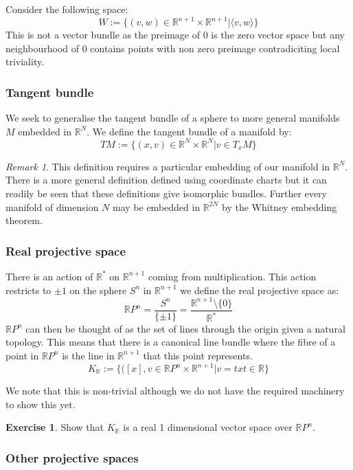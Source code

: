\documentclass[a4paper,10pt]{article}
\theoremstyle{plain}%
\theoremstyle{definition}
\newtheorem{exer}{Exercise}
\theoremstyle{remark}
\newtheorem{rem}{Remark}
\newcommand{\RR}{\mathbb{R}}
\begin{document}
Consider the following space:
$$W:=\{ (v,w) \in \RR^{n+1}\times \RR^{n+1} | \langle v,w \rangle \}$$
This is not a vector bundle as the preimage of $0$ is the zero vector space but any neighbourhood of $0$ 
contains points with non zero preimage contradiciting local triviality.

\subsubsection{Tangent bundle}

We seek to generalise the tangent bundle of a sphere to more general manifolds $M$ embedded in $\RR^N$.
We define the tangent bundle of a manifold by:
$$TM:=\{ (x,v)\in \RR^N\times\RR^N | v\in T_xM \}$$

\begin{rem}
 This definition requires a particular embedding of our manifold in $\RR^N$. There is a more general definition
defined using coordinate charts but it can readily be seen that these definitions give isomorphic bundles. Further 
every manifold of dimension $N$ may be embedded in $\RR^{2N}$ by the Whitney embedding theorem. 
\end{rem}


\subsubsection{Real projective space}

There is an action of $\RR^\ast$ on $\RR^{n+1}$ coming from multiplication. This action restricts to $\pm 1$ on 
the sphere $S^n$ in $\RR^{n+1}$ we define the real projective space as:
$$\RR P^n = \frac{S^n}{\{\pm 1\}} = \frac{\RR^{n+1}\setminus\{0\}}{\RR^\ast}$$
$\RR P^n$ can then be thought of as the set of lines through the origin given a natural topology. This means 
that there is a canonical line bundle where the fibre of a point in $\RR P^n$ is the line in $\RR^{n+1}$ that this 
point represents.
$$K_\RR := \{ ([x],v\in \RR P^n\times \RR^{n+1} | v=tx t\in \RR\}$$

We note that this is non-trivial although we do not have the required machinery to show this yet.

\begin{exer}
 Show that $K_\RR$ is a real 1 dimensional vector space over $\RR P^n$.
\end{exer}


\subsubsection{Other projective spaces}
\end{document}
